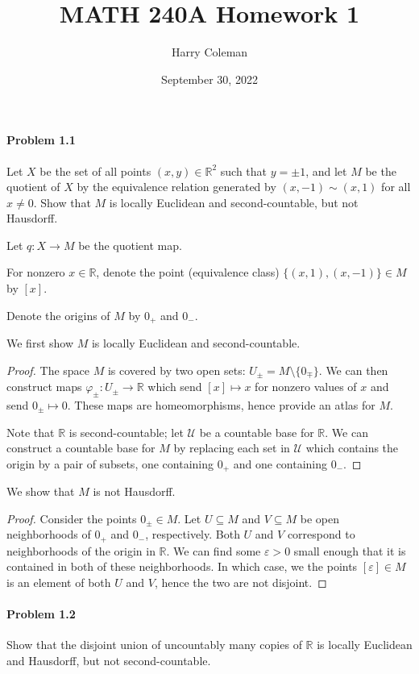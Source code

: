 \documentclass[12pt]{article}
\renewcommand{\maketitle}{\thispagestyle{title}}
\newlength{\myparskip}
\newenvironment{fullbox}{\begin{lrbox}{\savefullbox}\begin{minipage}{\dimexpr\textwidth-2\fboxsep\relax}\setlength{\parskip}{\myparskip}}{\end{minipage}\end{lrbox}\framebox[\textwidth]{\usebox{\savefullbox}}}
\newenvironment{pbox}[1][]{\begin{fullbox}\def\temp{#1}\ifx\temp\empty\else\paragraph{#1}\phantom{}\fi}{\end{fullbox}}
\theoremstyle{definition}
\newcommand{\R}{\mathbb{R}}
\newcommand{\eps}{\varepsilon}
\renewcommand{\phi}{\varphi}
\newcommand{\<}{\langle}
\renewcommand{\>}{\rangle}
\newcommand{\seq}{\subseteq}
\newcommand{\UU}{\mathcal{U}}
\begin{document}
\title{MATH 240A Homework 1}
\author{Harry Coleman}
\date{September 30, 2022}
\maketitle

\begin{pbox}[Problem 1.1]
    Let $X$ be the set of all points $(x, y) \in \R^2$ such that $y = \pm 1$, and let $M$ be the quotient of $X$ by the equivalence relation generated by $(x, -1) \sim (x, 1)$ for all $x \ne 0$.
    Show that $M$ is locally Euclidean and second-countable, but not Hausdorff.
\end{pbox}

Let $q : X \to M$ be the quotient map.

For nonzero $x \in \R$, denote the point (equivalence class) $\{(x, 1), (x, -1)\} \in M$ by $[x]$.

Denote the origins of $M$ by $0_+$ and $0_-$.

We first show $M$ is locally Euclidean and second-countable.

\begin{proof}
    The space $M$ is covered by two open sets: $U_\pm = M \setminus \{0_\mp\}$.
    We can then construct maps $\phi_\pm : U_\pm \to \R$ which send $[x] \mapsto x$ for nonzero values of $x$ and send $0_\pm \mapsto 0$.
    These maps are homeomorphisms, hence provide an atlas for $M$.

    Note that $\R$ is second-countable; let $\UU$ be a countable base for $\R$.
    We can construct a countable base for $M$ by replacing each set in $\UU$ which contains the origin by a pair of subsets, one containing $0_+$ and one containing $0_-$.
\end{proof}

We show that $M$ is not Hausdorff.

\begin{proof}
    Consider the points $0_\pm \in M$.
    Let $U \seq M$ and $V \seq M$ be open neighborhoods of $0_+$ and $0_-$, respectively.
    Both $U$ and $V$ correspond to neighborhoods of the origin in $\R$.
    We can find some $\eps > 0$ small enough that it is contained in both of these neighborhoods.
    In which case, we the points $[\eps] \in M$ is an element of both $U$ and $V$, hence the two are not disjoint.
\end{proof}


\newpage
\begin{pbox}[Problem 1.2]
    Show that the disjoint union of uncountably many copies of $\R$ is locally Euclidean and Hausdorff, but not second-countable.
\end{pbox}
\end{document}
